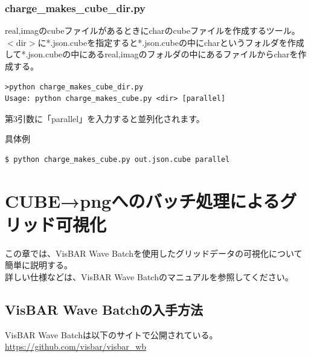 \documentclass{jsarticle}
\begin{document}
\subsubsection{charge\_makes\_cube\_dir.py}
real,imagのcubeファイルがあるときにcharのcubeファイルを作成するツール。\\
$<$dir$>$に*.json.cubeを指定すると*.json.cubeの中にcharというフォルダを作成して*.json.cubeの中にあるreal,imagのフォルダの中にあるファイルからcharを作成する。
\begin{Verbatim}[frame=single]
>python charge_makes_cube_dir.py
Usage: python charge_makes_cube.py <dir> [parallel]
\end{Verbatim}
第3引数に「parallel」を入力すると並列化されます。

具体例\\
\begin{Verbatim}[frame=single]
$ python charge_makes_cube.py out.json.cube parallel
\end{Verbatim}

\newpage
\section{CUBE→pngへのバッチ処理によるグリッド可視化}
この章では、VisBAR Wave Batchを使用したグリッドデータの可視化について簡単に説明する。\\
詳しい仕様などは、VisBAR Wave Batchのマニュアルを参照してください。\\

\subsection{VisBAR Wave Batchの入手方法}
VisBAR Wave Batchは以下のサイトで公開されている。\\
\url{https://github.com/visbar/visbar_wb}

\end{document}
